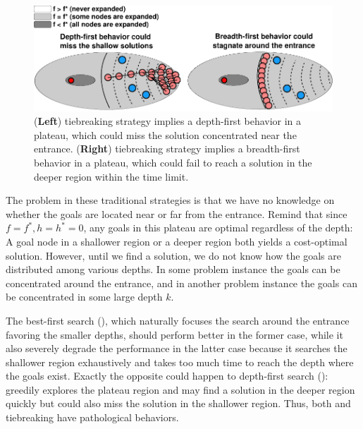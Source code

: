 \begin{figure}[htbp]
 \centering
  \includegraphics{img/astar/plateau-3.pdf}
 \caption{(\textbf{Left}) \lifo tiebreaking strategy implies a depth-first behavior in a
 plateau, which could miss the solution concentrated near the entrance.
 (\textbf{Right}) \fifo tiebreaking strategy implies a breadth-first behavior in a
 plateau, which could fail to reach a solution in the deeper region
 within the time limit.}
 \label{fig:plateau-depiction}
\end{figure}

The problem in these traditional strategies is that we have no knowledge
on whether the goals are located near or far from the entrance. Remind
that since $f=f^*, h=h^*=0$, any goals in this plateau are optimal
regardless of the depth: A goal node in a shallower region or a deeper
region both yields a cost-optimal solution. However, until we find a
solution, we do not know how the goals are distributed among various
depths. In some problem instance the goals can be concentrated around
the entrance, and in another problem instance the goals can be
concentrated in some large depth $k$.


The best-first search (\fifo), which naturally focuses the search around
the entrance favoring the smaller depths, should perform better in the
former case, while it also severely degrade the performance in the
latter case because it searches the
shallower region exhaustively and takes too much time to reach the depth
where the goals exist.
Exactly the opposite could happen to depth-first search (\lifo):
\lifo greedily explores the
plateau region and may find a solution in the deeper region quickly but
could also miss the solution in the shallower region.
Thus, both \fifo and \lifo tiebreaking have pathological behaviors.

